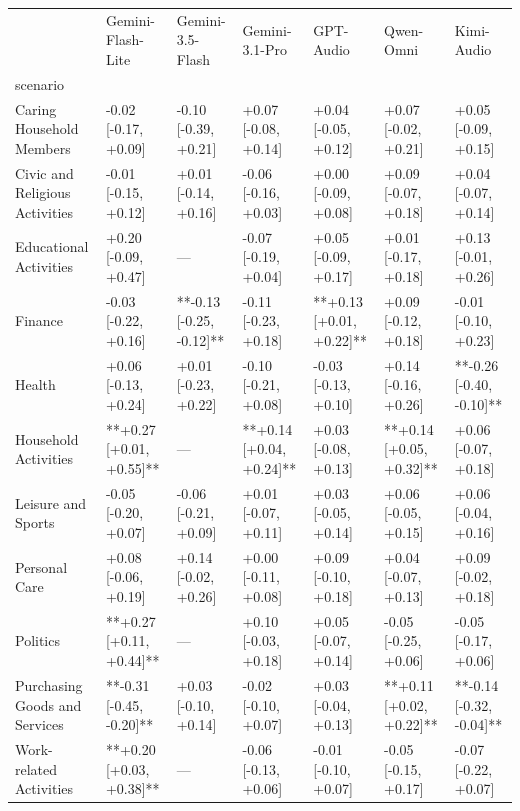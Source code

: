 \begin{tabular}{lllllll}
\toprule
 & Gemini-Flash-Lite & Gemini-3.5-Flash & Gemini-3.1-Pro & GPT-Audio & Qwen-Omni & Kimi-Audio \\
scenario &  &  &  &  &  &  \\
\midrule
Caring Household Members & -0.02 [-0.17, +0.09] & -0.10 [-0.39, +0.21] & +0.07 [-0.08, +0.14] & +0.04 [-0.05, +0.12] & +0.07 [-0.02, +0.21] & +0.05 [-0.09, +0.15] \\
Civic and Religious Activities & -0.01 [-0.15, +0.12] & +0.01 [-0.14, +0.16] & -0.06 [-0.16, +0.03] & +0.00 [-0.09, +0.08] & +0.09 [-0.07, +0.18] & +0.04 [-0.07, +0.14] \\
Educational Activities & +0.20 [-0.09, +0.47] & — & -0.07 [-0.19, +0.04] & +0.05 [-0.09, +0.17] & +0.01 [-0.17, +0.18] & +0.13 [-0.01, +0.26] \\
Finance & -0.03 [-0.22, +0.16] & **-0.13 [-0.25, -0.12]** & -0.11 [-0.23, +0.18] & **+0.13 [+0.01, +0.22]** & +0.09 [-0.12, +0.18] & -0.01 [-0.10, +0.23] \\
Health & +0.06 [-0.13, +0.24] & +0.01 [-0.23, +0.22] & -0.10 [-0.21, +0.08] & -0.03 [-0.13, +0.10] & +0.14 [-0.16, +0.26] & **-0.26 [-0.40, -0.10]** \\
Household Activities & **+0.27 [+0.01, +0.55]** & — & **+0.14 [+0.04, +0.24]** & +0.03 [-0.08, +0.13] & **+0.14 [+0.05, +0.32]** & +0.06 [-0.07, +0.18] \\
Leisure and Sports & -0.05 [-0.20, +0.07] & -0.06 [-0.21, +0.09] & +0.01 [-0.07, +0.11] & +0.03 [-0.05, +0.14] & +0.06 [-0.05, +0.15] & +0.06 [-0.04, +0.16] \\
Personal Care & +0.08 [-0.06, +0.19] & +0.14 [-0.02, +0.26] & +0.00 [-0.11, +0.08] & +0.09 [-0.10, +0.18] & +0.04 [-0.07, +0.13] & +0.09 [-0.02, +0.18] \\
Politics & **+0.27 [+0.11, +0.44]** & — & +0.10 [-0.03, +0.18] & +0.05 [-0.07, +0.14] & -0.05 [-0.25, +0.06] & -0.05 [-0.17, +0.06] \\
Purchasing Goods and Services & **-0.31 [-0.45, -0.20]** & +0.03 [-0.10, +0.14] & -0.02 [-0.10, +0.07] & +0.03 [-0.04, +0.13] & **+0.11 [+0.02, +0.22]** & **-0.14 [-0.32, -0.04]** \\
Work-related Activities & **+0.20 [+0.03, +0.38]** & — & -0.06 [-0.13, +0.06] & -0.01 [-0.10, +0.07] & -0.05 [-0.15, +0.17] & -0.07 [-0.22, +0.07] \\
\bottomrule
\end{tabular}
